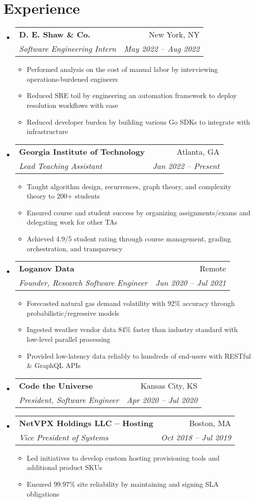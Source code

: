 \documentclass[a4paper,11pt]{extarticle}
\makeatletter
\newcommand{\resumeItem}[1]{
	\item\small{
		#1 \vspace{-2pt}
	}
}
\newcommand{\resumeSubheading}[4]{
	\vspace{-1pt}\item
		\begin{tabular*}{1\linewidth}{l@{\extracolsep{\fill}}r}
			\textbf{#1} & #2 \\
			\textit{#3} & \textit{#4} \\
		\end{tabular*}\vspace{-3pt}
}
\newcommand{\resumeSubHeadingListStart}{
    \begin{itemize}[leftmargin=0.15in,label={}]}
\newcommand{\resumeSubHeadingListEnd}{\end{itemize}}
\newcommand{\resumeItemListStart}{\begin{itemize}\vspace{-3pt}}
\newcommand{\resumeItemListEnd}{\end{itemize}\vspace{-3pt}}
\makeatother
\begin{document}
\section{Experience}
	\resumeSubHeadingListStart
        \resumeSubheading
            {D. E. Shaw \& Co.}
            {New York, NY}
            {Software Engineering Intern}
            {May 2022 -- Aug 2022}
		\resumeItemListStart
            \resumeItem{Performed analysis on the cost of manual labor by interviewing
                operations-burdened engineers}
            \resumeItem{Reduced SRE toil by engineering an automation
                framework to deploy resolution workflows with ease}
            \resumeItem{Reduced developer burden by building various Go SDKs to 
                integrate with infrastructure}
		\resumeItemListEnd
        \resumeSubheading
            {Georgia Institute of Technology}
            {Atlanta, GA}
            {Lead Teaching Assistant}
            {Jan 2022 -- Present}
		\resumeItemListStart
			\resumeItem{Taught algorithm design, recurrences, graph
            theory, and complexity theory to 200+ students}
            \resumeItem{Ensured course and student success by organizing 
                assignments/exams and delegating work for other TAs}
            \resumeItem{Achieved 4.9/5 student rating through course management,
                grading orchestration, and transparency}
		\resumeItemListEnd
		\resumeSubheading
            {Loganov Data}
            {Remote}
		    {Founder, Research Software Engineer}
            {Jun 2020 -- Jul 2021}
		\resumeItemListStart
			\resumeItem{Forecasted natural gas demand volatility with 92\%
				accuracy through probabilistic/regressive models}
			\resumeItem{Ingested weather vendor data 84\% faster than industry
				standard with low-level parallel processing}
			\resumeItem{Provided low-latency data reliably to hundreds of
				end-users with RESTful \& GraphQL APIs}
		\resumeItemListEnd
		\resumeSubheading
            {Code the Universe}
            {Kansas City, KS}
		    {President, Software Engineer}
            {Apr 2020 -- Jul 2020}
        \vspace{-1mm}
		\resumeSubheading
            {NetVPX Holdings LLC -- Hosting}
            {Boston, MA}
		    {Vice President of Systems}
            {Oct 2018 -- Jul 2019}
		\resumeItemListStart
			\resumeItem{Led initiatives to develop custom hosting provisioning
				tools and additional product SKUs}
			\resumeItem{Ensured $99.97$\% site reliability by maintaining
				and signing SLA obligations}
		\resumeItemListEnd
	\resumeSubHeadingListEnd
\end{document}
